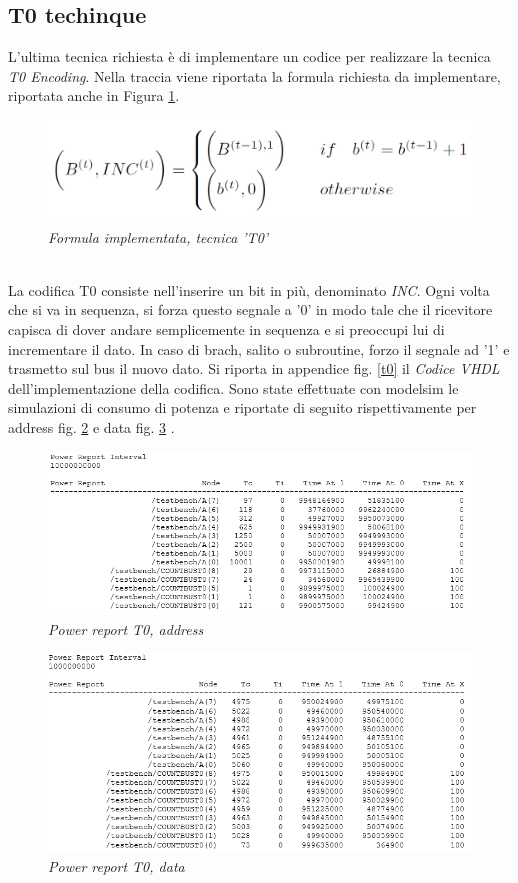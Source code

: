 \subsection{T0 techinque}
L'ultima tecnica richiesta è di implementare un codice per realizzare la tecnica \textit{T0 Encoding}. Nella traccia viene riportata la formula richiesta da implementare, riportata anche in Figura \ref{formula_t0}.\\
\begin{figure}[!htb]
	\centering
	\includegraphics[scale=0.8]{immagini/formula_t0}
	\caption{\textit{Formula implementata, tecnica 'T0'}}
	\label{formula_t0}
\end{figure}
\\
\noindent La codifica T0 consiste nell'inserire un bit in più, denominato \textit{INC}. Ogni volta che si va in sequenza, si forza questo segnale a '0' in modo tale che il ricevitore capisca di dover andare semplicemente in sequenza e si preoccupi lui di incrementare il dato. In caso di brach, salito o subroutine, forzo il segnale ad '1' e trasmetto sul bus il nuovo dato. Si riporta in appendice fig. \ref{t0} il \textit{Codice VHDL} dell'implementazione della codifica.
Sono state effettuate con modelsim le simulazioni di consumo di potenza e riportate di seguito rispettivamente per address fig. \ref{T0_address_power}   e data fig. \ref{T0_data_power} . 
\begin{figure}[!htb]
	\centering
	\includegraphics[scale=0.6]{immagini/T0_address_power}
	\caption{\textit{Power report T0, address}}
	\label{T0_address_power}
\end{figure}
\begin{figure}[!htb]
	\centering
	\includegraphics[scale=0.6]{immagini/T0_data_power}
	\caption{\textit{Power report T0, data}}
	\label{T0_data_power}
\end{figure}
\newpage
